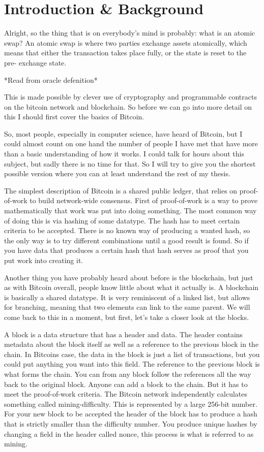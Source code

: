 \chapter{Introduction \& Background}
Alright, so the thing that is on everybody's mind is probably: what is an atomic
swap? An atomic swap is where two parties exchange assets atomically, which means
that either the transaction takes place fully, or the state is reset to the pre-
exchange state.

*Read from oracle defenition*

This is made possible by clever use of cryptography and
programmable contracts on the bitcoin network and blockchain. So before we can
go into more detail on this I should first cover the basics of Bitcoin.

So, most people, especially in computer science, have heard of Bitcoin, but I could
almost count on one hand the number of people I have met that have more than
a basic understanding of how it works. I could talk for hours about this
subject, but sadly there is no time for that. So I will try to give you the
shortest possible version where you can at least understand the rest of my
thesis.

The simplest description of Bitcoin is a shared public ledger, that relies
on proof-of-work to build network-wide consensus. First of proof-of-work
is a way to prove mathematically that work was put into doing something.
The most common way of doing this is via hashing of some datatype.
The hash has to meet certain criteria to be accepted. There is no known
way of producing a wanted hash, so the only way is to try different combinations
until a good result is found. So if you have data that produces a certain hash
that hash serves as proof that you put work into creating it.

Another thing you have probably heard about before is the blockchain, but
just as with Bitcoin overall, people know little about what it actually is.
A blockchain is basically a shared datatype. It is very reminiscent of a
linked list, but allows for branching, meaning that two elements can link
to the same parent. We will come back to this in a moment, but first, let's
take a closer look at the blocks.

A block is a data structure that has a header and data. The header contains
metadata about the block itself as well as a reference to the previous block
in the chain. In Bitcoins case, the data in the block is just a list of transactions,
but you could put anything you want into this field. The reference to the previous
block is what forms the chain. You can from any block follow the references
all the way back to the original block. Anyone can add a block to the chain. But
it has to meet the proof-of-work criteria. The Bitcoin network independently calculates
something called mining-difficulty. This is represented by a large 256-bit number.
For your new block to be accepted the header of the block has to produce a hash that
is strictly smaller than the difficulty number. You produce unique hashes by changing
a field in the header called nonce, this process is what is referred to as mining.

